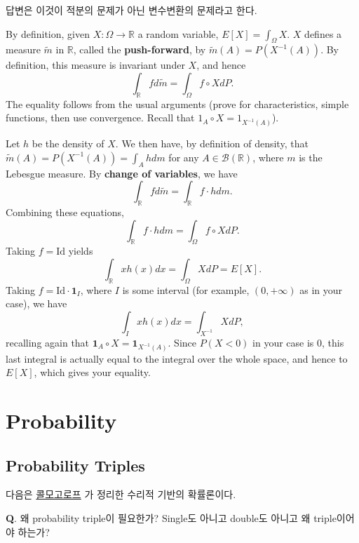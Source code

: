 \documentclass[
  letterpaper,
  DIV=11,
  numbers=noendperiod]{scrreprt}
\theoremstyle{definition}
\theoremstyle{plain}
\theoremstyle{plain}
\theoremstyle{definition}
\theoremstyle{plain}
\theoremstyle{definition}
\theoremstyle{remark}
\begin{document}
답변은 이것이 적분의 문제가 아닌 변수변환의 문제라고 한다.

By definition, given \(X: \Omega \rightarrow \mathbb{R}\) a random
variable, \(E[X] = \int_{\Omega} X\). \(X\) defines a measure
\(\tilde{m}\) in \(\mathbb{R}\), called the \textbf{push-forward}, by
\(\tilde{m}(A) = P(X^{-1}(A))\). By definition, this measure is
invariant under \(X\), and hence \[
\int_{\mathbb{R}} f d\tilde{m} = \int_{\Omega} f \circ X dP.
\] The equality follows from the usual arguments (prove for
characteristics, simple functions, then use convergence. Recall that
\(1_A \circ X = 1_{X^{-1}(A)}\)).

Let \(h\) be the density of \(X\). We then have, by definition of
density, that \(\tilde{m}(A) = P(X^{-1}(A)) = \int_A h dm\) for any
\(A \in \mathcal{B}(\mathbb{R})\), where \(m\) is the Lebesgue measure.
By \textbf{change of variables}, we have \[
\int_{\mathbb{R}}f d\tilde{m} = \int_{\mathbb{R}} f\cdot h dm.
\] Combining these equations, \[
\int_{\mathbb{R}} f \cdot h dm =\int_{\Omega} f \circ X dP.
\] Taking \(f=\text{Id}\) yields \[
\int_{\mathbb{R}}xh(x)dx = \int_{\Omega} X dP = E[X].
\] Taking \(f = \text{Id} \cdot \mathbf{1}_{I}\), where \(I\) is some
interval (for example, \((0, +\infty)\) as in your case), we have \[
\int_{I}xh(x)dx = \int_{X^{-1}}XdP,
\] recalling again that
\(\mathbf{1}_A \circ X = \mathbf{1}_{X^{-1}(A)}\). Since \(P(X<0)\) in
your case is \(0\), this last integral is actually equal to the integral
over the whole space, and hence to \(E[X]\), which gives your equality.

\chapter{Probability}\label{sec-prob}

\section{Probability Triples}\label{probability-triples}

다음은
\href{https://en.wikipedia.org/wiki/Andrey_Kolmogorov}{콜모고로프} 가
정리한 수리적 기반의 확률론이다.

\textbf{Q}. 왜 probability triple이 필요한가? Single도 아니고 double도
아니고 왜 triple이어야 하는가?
\end{document}

